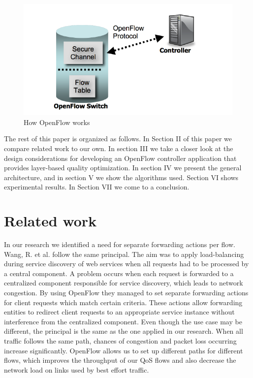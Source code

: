 \documentclass[conference]{IEEEtran}
\begin{document}
\begin{figure}[htb]
\centering
\includegraphics[scale=0.6]{fig/openflow1}
\caption{How OpenFlow works}
\label{fig:openflow1}
\end{figure}

The rest of this paper is organized as follows.
In Section II of this paper we compare related work to our own. 
In section III we take a closer look at the design considerations for 
developing an OpenFlow controller application that provides layer-based quality optimization. 
In section IV we present the general architecture, and in section V we show the algorithms used. 
Section VI shows experimental results.
In Section VII we come to a conclusion.

\section{Related work}
In our research we identified a need for separate forwarding actions per flow.
Wang, R. et al. \cite{wang2011openflow} follow the same principal.
The aim was to apply load-balancing during service discovery of web services 
when all requests had to be processed by a central component.
A problem occurs when each request is forwarded to a centralized component responsible 
for service discovery, which leads to network congestion. 
By using OpenFlow they managed to set separate forwarding actions for client requests which match 
certain criteria. These actions allow forwarding entities to redirect client requests to an 
appropriate service instance without interference from the centralized component. Even though 
the use case may be different, the principal is the same as the one applied in our research. 
When all traffic follows the same path, chances of congestion and packet loss 
occurring increase significantly. OpenFlow allows us to set up different paths for different flows, which 
improves the throughput of our QoS flows and also decrease the network load on links used by best 
effort traffic.
\end{document}
